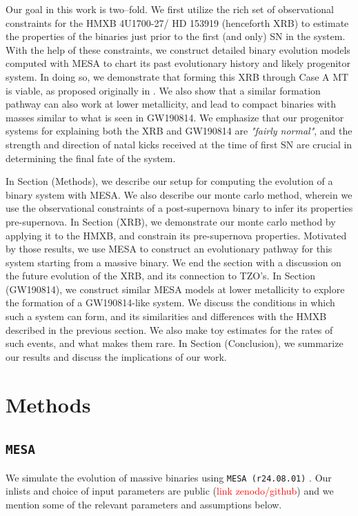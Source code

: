\documentclass[linenumbers,trackchanges,twocolumn]{aastex701}
\newcommand{\red}{\textcolor{red}}
\begin{document}
Our goal in this work is two--fold. We first utilize the rich set of observational constraints for the HMXB 4U1700-27/ HD 153919 (henceforth XRB) to estimate the properties of the binaries just prior to the first (and only) SN in the system. With the help of these constraints, we construct detailed binary evolution models computed with MESA to chart its past evolutionary history and likely progenitor system. In doing so, we demonstrate that forming this XRB through Case A MT is viable, as proposed originally in \cite{2021A&A...655A..31V}. We also show that a similar formation pathway can also work at lower metallicity, and lead to compact binaries with masses similar to what is seen in GW190814. We emphasize that our progenitor systems for explaining both the XRB and GW190814 are \textit{"fairly normal"}, and the strength and direction of natal kicks received at the time of first SN are crucial in determining the final fate of the system.

In Section (Methods), we describe our setup for computing the evolution of a binary system with MESA. We also describe our monte carlo method, wherein we use the observational constraints of a post-supernova binary to infer its properties pre-supernova. In Section (XRB), we demonstrate our monte carlo method by applying it to the HMXB, and constrain its pre-supernova properties. Motivated by those results, we use MESA to construct an evolutionary pathway for this system starting from a massive binary. We end the section with a discussion on the future evolution of the XRB, and its connection to TZO's. In Section (GW190814), we construct similar MESA models at lower metallicity to explore the formation of a GW190814-like system. We discuss the conditions in which such a system can form, and its similarities and differences with the HMXB described in the previous section. We also make toy estimates for the rates of such events, and what makes them rare. In Section (Conclusion), we summarize our results and discuss the implications of our work.

\section{Methods} \label{sec:methods}

\subsection{\texttt{MESA}}

We simulate the evolution of massive binaries using \texttt{MESA (r24.08.01)} \cite{2011ApJS..192....3P,2013ApJS..208....4P,2015ApJS..220...15P,2018ApJS..234...34P,2019ApJS..243...10P,2023ApJS..265...15J}. Our inlists and choice of input parameters are public (\red{link zenodo/github}) and we mention some of the relevant parameters and assumptions below.
\end{document}
